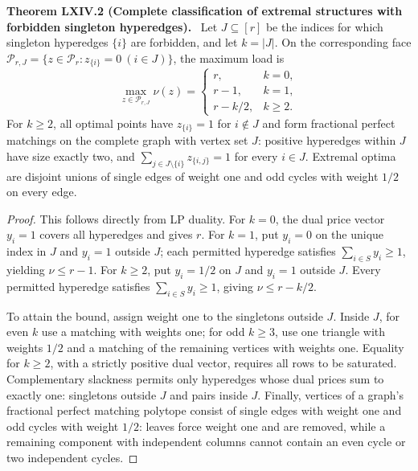 \documentclass[11pt,a4paper,oneside]{book}
\newcommand{\statement}[3]{\par\medskip\noindent\textbf{#1 #2 (#3).}\ }
\begin{document}
\statement{Theorem}{LXIV.2}{Complete classification of extremal structures with forbidden singleton hyperedges}
Let $J\subseteq[r]$ be the indices for which singleton hyperedges $\{i\}$ are forbidden, and let $k=|J|$. On the corresponding face $\mathcal P_{r,J}=\{z\in\mathcal P_r:z_{\{i\}}=0\ (i\in J)\}$, the maximum load is
\begin{equation}
\max_{z\in\mathcal P_{r,J}}\nu(z)=\begin{cases}
r,&k=0,\\r-1,&k=1,\\r-k/2,&k\ge2.
\end{cases}\tag{414}
\end{equation}
For $k\ge2$, all optimal points have $z_{\{i\}}=1$ for $i\notin J$ and form fractional perfect matchings on the complete graph with vertex set $J$: positive hyperedges within $J$ have size exactly two, and $\sum_{j\in J\setminus\{i\}}z_{\{i,j\}}=1$ for every $i\in J$. Extremal optima are disjoint unions of single edges of weight one and odd cycles with weight $1/2$ on every edge.
\begin{proof}
This follows directly from LP duality. For $k=0$, the dual price vector $y_i=1$ covers all hyperedges and gives $r$. For $k=1$, put $y_i=0$ on the unique index in $J$ and $y_i=1$ outside $J$; each permitted hyperedge satisfies $\sum_{i\in S}y_i\ge1$, yielding $\nu\le r-1$. For $k\ge2$, put $y_i=1/2$ on $J$ and $y_i=1$ outside $J$. Every permitted hyperedge satisfies $\sum_{i\in S}y_i\ge1$, giving $\nu\le r-k/2$.

To attain the bound, assign weight one to the singletons outside $J$. Inside $J$, for even $k$ use a matching with weights one; for odd $k\ge3$, use one triangle with weights $1/2$ and a matching of the remaining vertices with weights one. Equality for $k\ge2$, with a strictly positive dual vector, requires all rows to be saturated. Complementary slackness permits only hyperedges whose dual prices sum to exactly one: singletons outside $J$ and pairs inside $J$. Finally, vertices of a graph's fractional perfect matching polytope consist of single edges with weight one and odd cycles with weight $1/2$: leaves force weight one and are removed, while a remaining component with independent columns cannot contain an even cycle or two independent cycles.
\end{proof}
\end{document}
